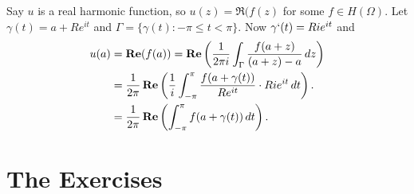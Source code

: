 Say $u$ is a real harmonic function, so \(u(z) = \Re(f(z)\) for some
\(f\in H(\Omega)\). 
Let \(\gamma(t) = a + Re^{it}\)
and \(\Gamma = \{\gamma(t): -\pi \leq t < \pi\}\). Now
\(\gamma`(t) = Rie^{it}\) and
\begin{align*}
u(a) 
 &= \mathop{\bf Re}\nolimits(f(a))
 = 
   \mathop{\bf Re}\nolimits\left(
     \frac{1}{2\pi i}
     \int_{\Gamma} \frac{f(a+z)}{(a+z)-a}\,dz
   \right) 
 \\
 &= \frac{1}{2\pi} 
   \mathop{\bf Re}\nolimits\left(
    \frac{1}{i}
     \int_{-\pi}^\pi \frac{f(a+\gamma(t))}{Re^{it}}\cdot Rie^{it}\,dt
   \right).
 \\
 &= \frac{1}{2\pi} 
   \mathop{\bf Re}\nolimits\left(
     \int_{-\pi}^\pi f(a+\gamma(t))\,dt
   \right).
\end{align*}
\fi


\section{The Exercises} %

